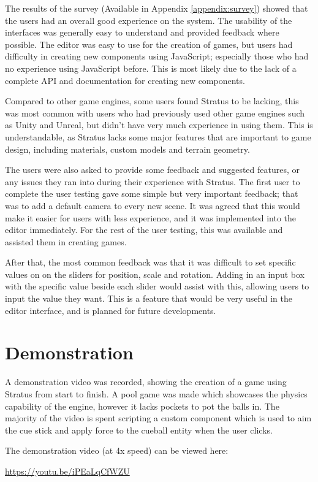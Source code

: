 	The results of the survey (Available in Appendix \ref{appendix:survey}) showed that the users had an overall good experience on the system. The usability of the interfaces was generally easy to understand and provided feedback where possible. The editor was easy to use for the creation of games, but users had difficulty in creating new components using JavaScript; especially those who had no experience using JavaScript before. This is most likely due to the lack of a complete API and documentation for creating new components.

	Compared to other game engines, some users found Stratus to be lacking, this was most common with users who had previously used other game engines such as Unity and Unreal, but didn't have very much experience in using them. This is understandable, as Stratus lacks some major features that are important to game design, including materials, custom models and terrain geometry.

	The users were also asked to provide some feedback and suggested features, or any issues they ran into during their experience with Stratus. The first user to complete the user testing gave some simple but very important feedback; that was to add a default camera to every new scene. It was agreed that this would make it easier for users with less experience, and it was implemented into the editor immediately. For the rest of the user testing, this was available and assisted them in creating games.

	After that, the most common feedback was that it was difficult to set specific values on on the sliders for position, scale and rotation. Adding in an input box with the specific value beside each slider would assist with this, allowing users to input the value they want. This is a feature that would be very useful in the editor interface, and is planned for future developments.

\section{Demonstration}
A demonstration video was recorded, showing the creation of a game using Stratus from start to finish. A pool game was made which showcases the physics capability of the engine, however it lacks pockets to pot the balls in. The majority of the video is spent scripting a custom component which is used to aim the cue stick and apply force to the cueball entity when the user clicks.

The demonstration video (at 4x speed) can be viewed here:

\url{https://youtu.be/iPEaLqCfWZU}
